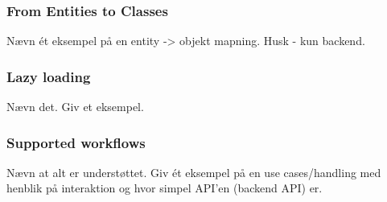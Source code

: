 \subsubsection{From Entities to Classes}
Nævn ét eksempel på en entity -> objekt mapning. Husk - kun backend.


\subsubsection{Lazy loading}
Nævn det.
Giv et eksempel.

\subsubsection{Supported workflows}
Nævn at alt er understøttet.
Giv ét eksempel på en use cases/handling med henblik på interaktion og hvor simpel API'en (backend API) er.
